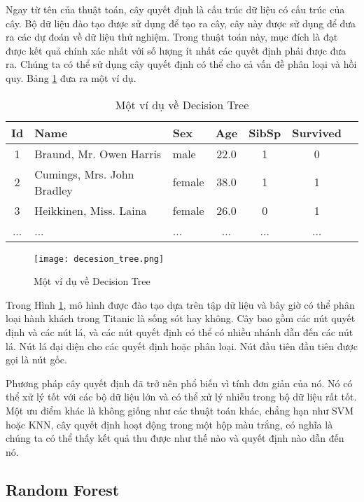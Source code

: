Ngay từ tên của thuật toán, cây quyết định là cấu trúc dữ liệu có cấu trúc của cây. Bộ dữ liệu đào tạo được sử dụng để tạo ra cây, cây này được sử dụng để đưa ra các dự đoán về dữ liệu thử nghiệm. Trong thuật toán này, mục đích là đạt được kết quả chính xác nhất với số lượng ít nhất các quyết định phải được đưa ra. Chúng ta có thể sử dụng cây quyết định có thể cho cả vấn đề phân loại và hồi quy. Bảng \ref{table:decision-tree} đưa ra một ví dụ.

\begin{table}[ht]
\caption{Một ví dụ về Decision Tree}
\centering
\label{table:decision-tree}
\begin{tabular}{c l l c c c c}
\hline
Id & Name                       & Sex    & Age  & SibSp & Survived \\	
\hline
1  & Braund, Mr. Owen Harris    & male   & 22.0	& 1     & 0	\\
2  & Cumings, Mrs. John Bradley & female & 38.0	& 1     & 1	\\
3  & Heikkinen, Miss. Laina	    & female & 26.0	& 0     & 1 \\
...& ...                        & ...    & ...  & ...   & ... \\ 
\hline 
\end{tabular}
\end{table}

\begin{figure}[htbp!] 
\centering    
\texttt{[image: decesion\_tree.png]}
\caption{Một ví dụ về Decision Tree \cite{wikidecesiontree}}
\label{fig:decision-tree}
\end{figure}

Trong Hình \ref{fig:decision-tree}, mô hình được đào tạo dựa trên tập dữ liệu và bây giờ có thể phân loại hành khách trong Titanic là sống sót hay không. Cây bao gồm các nút quyết định và các nút lá, và các nút quyết định có thể có nhiều nhánh dẫn đến các nút lá. Nút lá đại diện cho các quyết định hoặc phân loại. Nút đầu tiên đầu tiên được gọi là nút gốc.

Phương pháp cây quyết định đã trở nên phổ biến vì tính đơn giản của nó. Nó có thể xử lý tốt với các bộ dữ liệu lớn và có thể xử lý nhiễu trong bộ dữ liệu rất tốt. Một ưu điểm khác là không giống như các thuật toán khác, chẳng hạn như SVM hoặc KNN, cây quyết định hoạt động trong một hộp màu trắng, có nghĩa là chúng ta có thể thấy kết quả thu được như thế nào và quyết định nào dẫn đến nó.

\subsection{Random Forest}
\label{ssec:random-forest}

